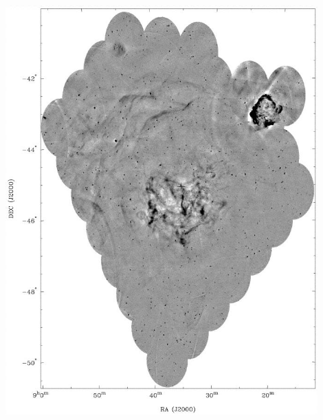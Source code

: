\begin{minipage}[t]{15cm}
%
 \begin{center}
    \includegraphics[width=12cm,height=!]{./E/vela_large_843MHz.jpg}
    \end{center}
\end{minipage}





